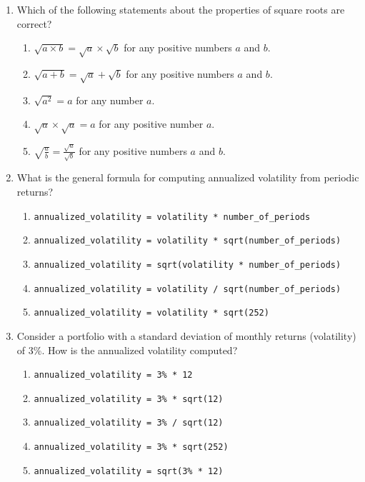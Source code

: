 \documentclass{article}
\begin{document}
\begin{enumerate}

\item Which of the following statements about the properties of square roots are correct?
    \begin{enumerate}
        \item $\sqrt{a \times b} = \sqrt{a} \times \sqrt{b}$ for any positive numbers \(a\) and \(b\).
        \item $\sqrt{a + b} = \sqrt{a} + \sqrt{b}$ for any positive numbers \(a\) and \(b\).
        \item $\sqrt{a^2} = a$ for any number \(a\).
        \item $\sqrt{a} \times \sqrt{a} = a$ for any positive number \(a\).
        \item $\sqrt{\frac{a}{b}} = \frac{\sqrt{a}}{\sqrt{b}}$ for any positive numbers \(a\) and \(b\).
    \end{enumerate}

    \item What is the general formula for computing annualized volatility from periodic returns?
    \begin{enumerate}
        \item \texttt{annualized\_volatility = volatility * number\_of\_periods}
        \item \texttt{annualized\_volatility = volatility * sqrt(number\_of\_periods)}
        \item \texttt{annualized\_volatility = sqrt(volatility * number\_of\_periods)}
        \item \texttt{annualized\_volatility = volatility / sqrt(number\_of\_periods)}
        \item \texttt{annualized\_volatility = volatility * sqrt(252)}
    \end{enumerate}

    \item Consider a portfolio with a standard deviation of monthly returns (volatility) of 3\%. How is the annualized volatility computed?
    
    \begin{enumerate}
        \item \texttt{annualized\_volatility = 3\% * 12}
        \item \texttt{annualized\_volatility = 3\% * sqrt(12)}
        \item \texttt{annualized\_volatility = 3\% / sqrt(12)}
        \item \texttt{annualized\_volatility = 3\% * sqrt(252)}
        \item \texttt{annualized\_volatility = sqrt(3\% * 12)}
    \end{enumerate}


\end{enumerate}
\end{document}
